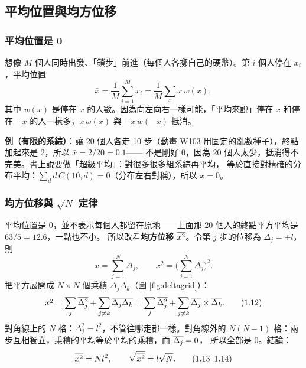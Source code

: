 \subsection{平均位置與均方位移}

\subsubsection*{平均位置是 0}
想像 $M$ 個人同時出發、「鎖步」前進（每個人各擲自己的硬幣）。第 $i$ 個人停在 $x_i$，平均位置
\begin{equation}
\bar x=\frac1M\sum_{i=1}^Mx_i=\frac1M\sum_x x\,w(x), \tag{1.8--1.9}
\end{equation}
其中 $w(x)$ 是停在 $x$ 的人數。因為向左向右一樣可能，「平均來說」停在 $x$ 和停在 $-x$ 的人一樣多，$x\,w(x)$ 與 $-x\,w(-x)$ 抵消。

\textbf{例（有限的系綜）}：讓 20 個人各走 10 步（動畫 W103 用固定的亂數種子），終點加起來是 2，所以 $\bar x=2/20=0.1$——
不是剛好 0，因為 20 個人太少，抵消得不完美。書上說要做「超級平均」：對很多很多組系綜再平均，
等於直接對精確的分布平均：$\sum_dd\,C(10,d)=0$（分布左右對稱），所以 $\bar x=0$。

\subsubsection*{均方位移與 $\sqrt N$ 定律}
平均位置是 0，並不表示每個人都留在原地——上面那 20 個人的終點平方平均是 $63/5=12.6$，一點也不小。
所以改看\textbf{均方位移} $\overline{x^2}$。令第 $j$ 步的位移為 $\Delta_j=\pm l$，則
\begin{equation}
x=\sum_{j=1}^N\Delta_j,\qquad x^2=\Big(\sum_{j=1}^N\Delta_j\Big)^2. \tag{1.11, 1.10}
\end{equation}
把平方展開成 $N\times N$ 個乘積 $\Delta_j\Delta_k$（圖 \ref{fig:deltagrid}）：
\begin{equation}
\overline{x^2}=\sum_j\overline{\Delta_j^2}+\sum_{j\ne k}\overline{\Delta_j\Delta_k}
=\sum_j\overline{\Delta_j^2}+\sum_{j\ne k}\overline{\Delta_j}\times\overline{\Delta_k}. \tag{1.12}
\end{equation}
對角線上的 $N$ 格：$\Delta_j^2=l^2$，不管往哪走都一樣。對角線外的 $N(N-1)$ 格：兩步互相獨立，乘積的平均等於平均的乘積，而 $\overline{\Delta_j}=0$，
所以全部是 0。結論：
\begin{equation}
\overline{x^2}=Nl^2,\qquad \sqrt{\overline{x^2}}=l\sqrt N. \tag{1.13--1.14}
\end{equation}

